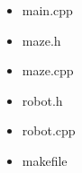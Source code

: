 \documentclass[11pt, a4paper]{article}
\begin{document}
    \begin{itemize}
        \item main.cpp
            
        \newpage
        \item maze.h
            
        \item maze.cpp
            
        \item robot.h
            
        \newpage
        \item robot.cpp
            
        \item makefile
            
    \end{itemize}
\end{document}
